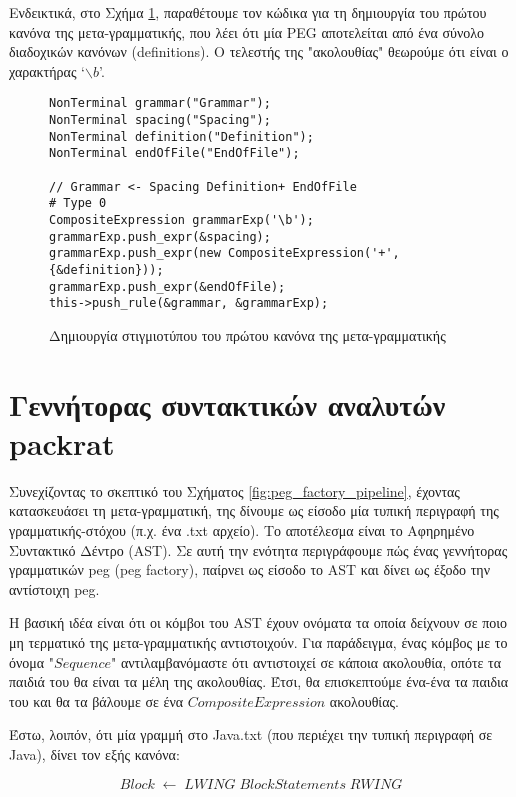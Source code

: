 Ενδεικτικά, στο Σχήμα \ref{fig:meta_example}, παραθέτουμε τον κώδικα για τη δημιουργία του πρώτου κανόνα της μετα-γραμματικής, που λέει ότι μία PEG αποτελείται από ένα σύνολο διαδοχικών κανόνων (definitions). O τελεστής της "ακολουθίας" θεωρούμε ότι είναι ο χαρακτήρας `$\backslash b$'.

\begin{figure}[h]
\setlength\partopsep{-\topsep}%
\begin{verbatim}
NonTerminal grammar("Grammar");
NonTerminal spacing("Spacing");
NonTerminal definition("Definition");
NonTerminal endOfFile("EndOfFile");

// Grammar <- Spacing Definition+ EndOfFile                     # Type 0
CompositeExpression grammarExp('\b');
grammarExp.push_expr(&spacing);
grammarExp.push_expr(new CompositeExpression('+', {&definition}));
grammarExp.push_expr(&endOfFile);
this->push_rule(&grammar, &grammarExp);
\end{verbatim}
\caption{Δημιουργία στιγμιοτύπου του πρώτου κανόνα της μετα-γραμματικής}
\label{fig:meta_example}
\end{figure}

\section{Γεννήτορας συντακτικών αναλυτών packrat}

Συνεχίζοντας το σκεπτικό του Σχήματος \ref{fig:peg_factory_pipeline}, έχοντας κατασκευάσει τη μετα-γραμματική, της δίνουμε ως είσοδο μία τυπική περιγραφή της γραμματικής-στόχου (π.χ. ένα .txt αρχείο).
Το αποτέλεσμα είναι το Αφηρημένο Συντακτικό Δέντρο (AST).
Σε αυτή την ενότητα περιγράφουμε πώς ένας γεννήτορας γραμματικών peg (peg factory), παίρνει ως είσοδο το AST και δίνει ως έξοδο την αντίστοιχη peg.

Η βασική ιδέα είναι ότι οι κόμβοι του AST έχουν ονόματα τα οποία δείχνουν σε ποιο μη τερματικό της μετα-γραμματικής αντιστοιχούν.
Για παράδειγμα, ένας κόμβος με το όνομα "$Sequence$" αντιλαμβανόμαστε ότι αντιστοιχεί σε κάποια ακολουθία, οπότε τα παιδιά του θα είναι τα μέλη της ακολουθίας.
Έτσι, θα επισκεπτούμε ένα-ένα τα παιδια του και θα τα βάλουμε σε ένα $CompositeExpression$ ακολουθίας.

Έστω, λοιπόν, ότι μία γραμμή στο Java.txt (που περιέχει την τυπική περιγραφή σε Java), δίνει τον εξής κανόνα:

\begin{equation}
	Block \; \leftarrow \; LWING \; BlockStatements \; RWING
\end{equation}

